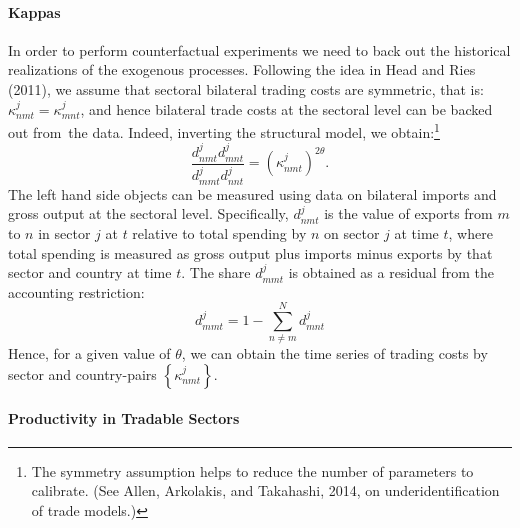\documentclass[12pt]{article}
\begin{document}
\paragraph{Kappas}

In order to perform counterfactual experiments we need to back out the
historical realizations of the exogenous processes. Following the idea in
Head and Ries (2011), we assume that sectoral bilateral trading costs are
symmetric, that is: $\kappa _{nmt}^{j}=\kappa _{mnt}^{j}$, and hence
bilateral trade costs at the sectoral level can be backed out from\ the
data. Indeed, inverting the structural model, we obtain:\footnote{%
The symmetry assumption helps to reduce the number of parameters to
calibrate. (See Allen, Arkolakis, and Takahashi, 2014, on
underidentification of trade models.)} 
\begin{equation}
\frac{d_{nmt}^{j}d_{mnt}^{j}}{d_{mmt}^{j}d_{nnt}^{j}}=\left( \kappa
_{nmt}^{j}\right) ^{2\theta }.  \label{kappa}
\end{equation}%
The left hand side objects can be measured using data on bilateral imports
and gross output at the sectoral level. Specifically, $d_{nmt}^{j}$ is the
value of exports from $m$ to $n$ in sector $j$ at $t$ relative to total
spending by $n$ on sector $j$ at time $t$, where total spending is measured
as gross output plus imports minus exports by that sector and country at
time $t.$ The share $d_{mmt}^{j}$ is obtained as a residual from the
accounting restriction: 
\begin{equation*}
d_{mmt}^{j}=1-\sum\limits_{n\neq m}^{N}d_{mnt}^{j}
\end{equation*}%
Hence, for a given value of $\theta $, we can obtain the time series of
trading costs by sector and country-pairs $\left\{ \kappa _{nmt}^{j}\right\} 
$.

\paragraph{Productivity in Tradable Sectors}
\end{document}
